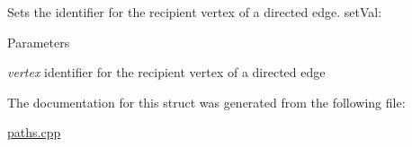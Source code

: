 Sets the identifier for the recipient vertex of a directed edge. setVal: 
\begin{DoxyParams}{Parameters}
\item[{\em vertex}]identifier for the recipient vertex of a directed edge \end{DoxyParams}


The documentation for this struct was generated from the following file:\begin{DoxyCompactItemize}
\item 
\hyperlink{paths_8cpp}{paths.cpp}\end{DoxyCompactItemize}
